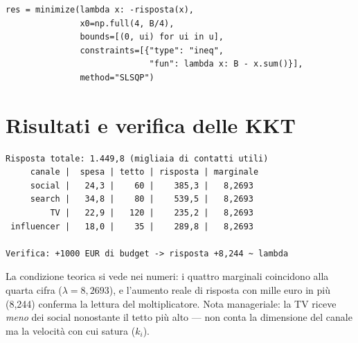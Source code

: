 \begin{lstlisting}[style=python]
res = minimize(lambda x: -risposta(x),
               x0=np.full(4, B/4),
               bounds=[(0, ui) for ui in u],
               constraints=[{"type": "ineq",
                             "fun": lambda x: B - x.sum()}],
               method="SLSQP")
\end{lstlisting}

\section{Risultati e verifica delle KKT}

\begin{lstlisting}[style=output]
Risposta totale: 1.449,8 (migliaia di contatti utili)
     canale |  spesa | tetto | risposta | marginale
     social |   24,3 |    60 |    385,3 |   8,2693
     search |   34,8 |    80 |    539,5 |   8,2693
         TV |   22,9 |   120 |    235,2 |   8,2693
 influencer |   18,0 |    35 |    289,8 |   8,2693

Verifica: +1000 EUR di budget -> risposta +8,244 ~ lambda
\end{lstlisting}

\begin{insight}
La condizione teorica si vede nei numeri: i quattro marginali coincidono alla quarta
cifra ($\lambda = 8{,}2693$), e l'aumento reale di risposta con mille euro in più
(8,244) conferma la lettura del moltiplicatore. Nota manageriale: la TV riceve
\emph{meno} dei social nonostante il tetto più alto --- non conta la dimensione del
canale ma la velocità con cui satura ($k_i$).
\end{insight}

